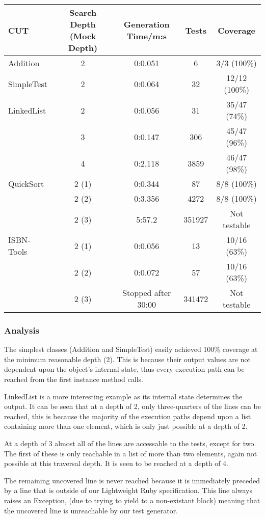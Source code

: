     \begin{tabular}{|l|cccc|}
\hline
\textbf{CUT} & \textbf{Search Depth (Mock Depth)} & \textbf{Generation Time/m:s} & \textbf{Tests} & \textbf{Coverage} \\
\hline
Addition & 2 & 0:0.051 & 6 & 3/3 (100\%) \\
\hline
SimpleTest & 2 & 0:0.064 & 32 & 12/12 (100\%) \\
\hline
LinkedList & 2 & 0:0.056 & 31 & 35/47 (74\%) \\
& 3 & 0:0.147 & 306 & 45/47 (96\%) \\
& 4 & 0:2.118 & 3859 & 46/47 (98\%)\\
\hline
QuickSort & 2 (1) & 0:0.344 & 87 & 8/8 (100\%) \\
& 2 (2) & 0:3.356 & 4272 & 8/8 (100\%) \\
& 2 (3) & 5:57.2 & 351927 & Not testable\\
\hline
ISBN-Tools & 2 (1) & 0:0.056 & 13 & 10/16 (63\%) \\
& 2 (2) & 0:0.072 & 57 & 10/16 (63\%) \\
& 2 (3) & Stopped after 30:00 & 341472 & Not testable \\
\hline
\end{tabular}

\subsubsection{Analysis}
  The simplest classes (Addition and SimpleTest) easily achieved 100\% coverage at the minimum reasonable depth (2).
This is because their output values are not dependent upon the object's internal state, thus every execution path can be reached from the first instance method calls.

  LinkedList is a more interesting example as its internal state determines the output.
It can be seen that at a depth of 2, only three-quarters of the lines can be reached, this is because the majority of the execution paths depend upon a list containing more than one element, which is only just possible at a depth of 2.

  At a depth of 3 almost all of the lines are accessable to the tests, except for two.
The first of these is only reachable in a list of more than two elements, again not possible at this traversal depth. It is seen to be reached at a depth of 4.

  The remaining uncovered line is never reached because it is immediately preceded by a line that is outside of our Lightweight Ruby specification.
This line always raises an Exception, (due to trying to yield to a non-existant block) meaning that the uncovered line is unreachable by our test generator.

